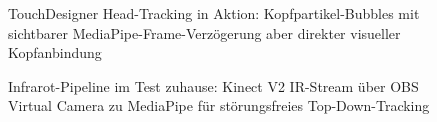 \begin{figure}[htbp]
    \centering
    \caption{TouchDesigner Head-Tracking in Aktion: Kopfpartikel-Bubbles mit sichtbarer MediaPipe-Frame-Verzögerung aber direkter visueller Kopfanbindung}
    \label{fig:headtracking_bubbles_aktion}
\end{figure}

\FloatBarrier

\begin{figure}[htbp]
    \centering
    \caption{Infrarot-Pipeline im Test zuhause: Kinect V2 IR-Stream über OBS Virtual Camera zu MediaPipe für störungsfreies Top-Down-Tracking}
    \label{fig:infrarot_topdown_mapping}
\end{figure}

